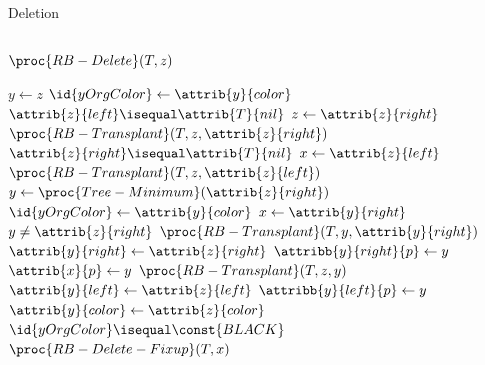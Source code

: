 \documentclass[aspectratio=1610]{beamer}
\begin{document}
\begin{frame}{Deletion}{}
\begin{columns}[t]
\begin{block}{$\proc{RB-Delete}(T,z)$}
            \vspace{-1.5\abovedisplayskip}
            \begin{codebox}
                \li $y \gets z$ 
                \li $\id{yOrgColor} \gets \attrib{y}{color}$ 
                \li \If $\attrib{z}{left} \isequal \attrib{T}{nil}$
                    \Then
                \li     $z \gets \attrib{z}{right}$
                \li     $\proc{RB-Transplant}(T,z,\attrib{z}{right})$
                \li \ElseIf $\attrib{z}{right} \isequal \attrib{T}{nil}$
                    \Then
                \li     $x \gets \attrib{z}{left}$
                \li     $\proc{RB-Transplant}(T,z,\attrib{z}{left})$
                \li \Else
                        $y \gets \proc{Tree-Minimum}(\attrib{z}{right})$ 
                \li     $\id{yOrgColor} \gets \attrib{y}{color}$ 
                \li     $x \gets \attrib{y}{right}$
                \li     \If $y \neq \attrib{z}{right}$ 
                        \Then
                \li         $\proc{RB-Transplant}(T,y,\attrib{y}{right})$
                \li         $\attrib{y}{right} \gets \attrib{z}{right}$
                \li         $\attribb{y}{right}{p} \gets y$ 
                \li     \Else $\attrib{x}{p} \gets y$
                        \End
                \li     $\proc{RB-Transplant}(T,z,y)$
                \li     $\attrib{y}{left} \gets \attrib{z}{left}$
                \li     $\attribb{y}{left}{p} \gets y$
                \li     $\attrib{y}{color} \gets \attrib{z}{color}$
                    \End
                \li \If $\id{yOrgColor} \isequal \const{BLACK}$ 
                    \Then
                \li     $\proc{RB-Delete-Fixup}(T,x)$
                    \End
            \end{codebox}
        \end{block}
    \end{columns}
    
\end{frame}
\end{document}
